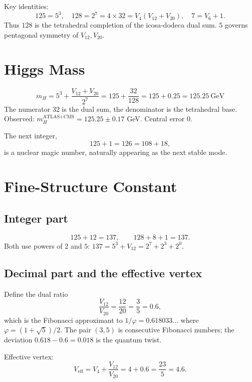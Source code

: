 \documentclass[12pt,a4paper]{article}
\begin{document}
Key identities:
\begin{equation}
125 =5^3,\quad 128 =2^7 =4\times32 =V_4(V_{12}+V_{20}),\quad 7=V_6+1.
\end{equation}
Thus $128$ is the tetrahedral completion of the icosa-dodeca dual sum. $5$ governs pentagonal symmetry of $V_{12},V_{20}$.

\section{Higgs Mass}
\begin{equation}
m_H =5^3+\frac{V_{12}+V_{20}}{2^7}=125+\frac{32}{128}=125+0.25=125.25\ \text{GeV}
\end{equation}
The numerator $32$ is the dual sum, the denominator is the tetrahedral base. Observed: $m_H^{\text{ATLAS+CMS}}=125.25\pm0.17$ GeV. Central error $0$.

The next integer,
\begin{equation}
125+1=126=108+18,
\end{equation}
is a nuclear magic number, naturally appearing as the next stable mode.

\section{Fine-Structure Constant}

\subsection{Integer part}
\begin{equation}
125+12=137,\qquad 128+8+1=137.
\end{equation}
Both use powers of $2$ and $5$: $137=5^3+V_{12}=2^7+2^3+2^0$.

\subsection{Decimal part and the effective vertex}
Define the dual ratio
\begin{equation}
\frac{V_{12}}{V_{20}}=\frac{12}{20}=\frac{3}{5}=0.6,
\end{equation}
which is the Fibonacci approximant to $1/\varphi=0.618033\ldots$ where $\varphi=(1+\sqrt5)/2$. The pair $(3,5)$ is consecutive Fibonacci numbers; the deviation $0.618-0.6=0.018$ is the quantum twist.

Effective vertex:
\begin{equation}
V_{\text{eff}} = V_4+\frac{V_{12}}{V_{20}}=4+0.6=\frac{23}{5}=4.6.
\end{equation}
\end{document}
